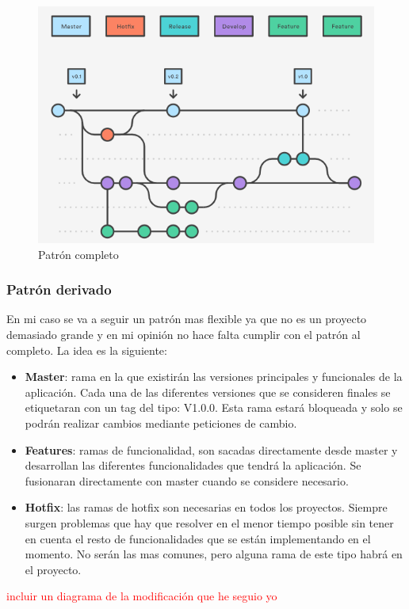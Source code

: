 \begin{figure}[H]
    \centering
    \includegraphics[scale=0.7]{imagenes/fundamentosHerramientas/gitflow.png}
    \caption{Patrón completo}
    \label{fig:gitflowCompleto}
\end{figure}

\subsubsection*{Patrón derivado}

En mi caso se va a seguir un patrón mas flexible ya que no es un proyecto demasiado grande y en mi opinión no hace falta cumplir con el patrón al completo. La idea es la siguiente: 
\begin{itemize}
    \item \textbf{Master}: rama en la que existirán las versiones principales y funcionales de la aplicación. Cada una de las diferentes versiones que se consideren finales se etiquetaran con un tag del tipo: V1.0.0. Esta rama estará bloqueada y solo se podrán realizar cambios mediante peticiones de cambio. 
    \item \textbf{Features}: ramas de funcionalidad, son sacadas directamente desde master y desarrollan las diferentes funcionalidades que tendrá la aplicación. Se fusionaran directamente con master cuando se considere necesario. 
    \item \textbf{Hotfix}: las ramas de hotfix son necesarias en todos los proyectos. Siempre surgen problemas que hay que resolver en el menor tiempo posible sin tener en cuenta el resto de funcionalidades que se están implementando en el momento. No serán las mas comunes, pero alguna rama de este tipo habrá en el proyecto. 
\end{itemize}

\textcolor{red}{incluir un diagrama de la modificación que he seguio yo}
